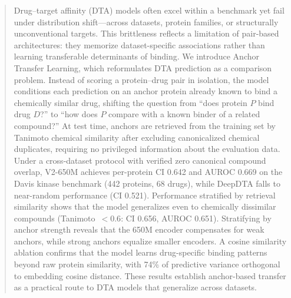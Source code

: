 \begin{abstract}
Drug--target affinity (DTA) models often excel within a benchmark yet fail under distribution shift---across datasets, protein families, or structurally unconventional targets. This brittleness reflects a limitation of pair-based architectures: they memorize dataset-specific associations rather than learning transferable determinants of binding. We introduce Anchor Transfer Learning, which reformulates DTA prediction as a comparison problem. Instead of scoring a protein--drug pair in isolation, the model conditions each prediction on an anchor protein already known to bind a chemically similar drug, shifting the question from ``does protein $P$ bind drug $D$?'' to ``how does $P$ compare with a known binder of a related compound?'' At test time, anchors are retrieved from the training set by Tanimoto chemical similarity after excluding canonicalized chemical duplicates, requiring no privileged information about the evaluation data. Under a cross-dataset protocol with verified zero canonical compound overlap, V2-650M achieves per-protein CI 0.642 and AUROC 0.669 on the Davis kinase benchmark (442 proteins, 68 drugs), while DeepDTA falls to near-random performance (CI 0.521). Performance stratified by retrieval similarity shows that the model generalizes even to chemically dissimilar compounds (Tanimoto~$< 0.6$: CI 0.656, AUROC 0.651). Stratifying by anchor strength reveals that the 650M encoder compensates for weak anchors, while strong anchors equalize smaller encoders. A cosine similarity ablation confirms that the model learns drug-specific binding patterns beyond raw protein similarity, with 74\% of predictive variance orthogonal to embedding cosine distance. These results establish anchor-based transfer as a practical route to DTA models that generalize across datasets.
\end{abstract}
